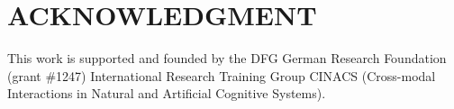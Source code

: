 \documentclass[letterpaper, 10 pt, conference]{ieeeconf}
\begin{document}

\section*{ACKNOWLEDGMENT}
This work is supported and founded by the DFG German Research Foundation (grant \#1247) International Research Training Group CINACS (Cross-modal Interactions in Natural and Artificial Cognitive Systems).




\end{document}
